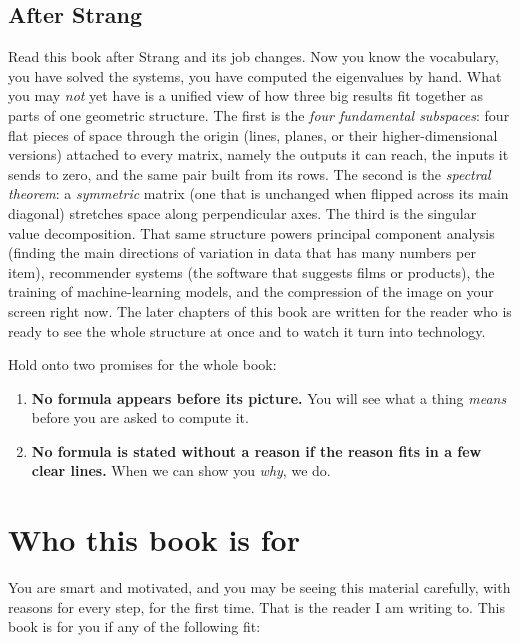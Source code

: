 \subsection*{After Strang}

Read this book after Strang and its job changes. Now you know the vocabulary, you
have solved the systems, you have computed the eigenvalues by hand. What you may
\emph{not} yet have is a unified view of how three big results fit together as
parts of one geometric structure. The first is the \emph{four fundamental
subspaces}: four flat pieces of space through the origin (lines, planes, or their
higher-dimensional versions) attached to every matrix, namely the outputs it can
reach, the inputs it sends to zero, and the same pair built from its rows. The
second is the \emph{spectral theorem}: a \emph{symmetric} matrix (one that is
unchanged when flipped across its main diagonal) stretches space along
perpendicular axes. The third is the singular value decomposition. That same
structure powers principal component analysis (finding the main directions of
variation in data that has many numbers per item), recommender systems (the
software that suggests films or products), the training of machine-learning models,
and the compression of the image on your screen right now. The later chapters of
this book are written for the reader who is ready to see the whole structure at
once and to watch it turn into technology.

\begin{focusbox}
Hold onto two promises for the whole book:
\begin{enumerate}
\item \textbf{No formula appears before its picture.} You will see what a thing
\emph{means} before you are asked to compute it.
\item \textbf{No formula is stated without a reason if the reason fits in a few
clear lines.} When we can show you \emph{why}, we do.
\end{enumerate}
\end{focusbox}

\section*{Who this book is for}

You are smart and motivated, and you may be seeing this material carefully, with
reasons for every step, for the first time. That is the reader I am writing to.
This book is for you if any of the following fit:


